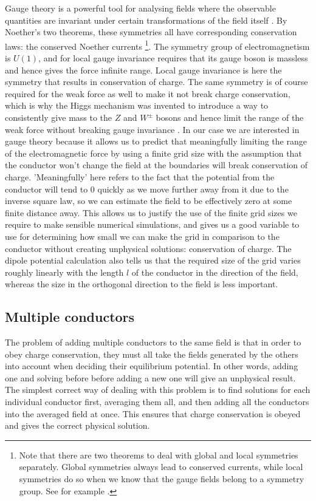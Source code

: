\documentclass[aps,twocolumn,pre,nofootinbib]{revtex4-1}
\begin{document}
Gauge theory is a powerful tool for analysing fields where the observable quantities are invariant under certain transformations of the field itself \cite{gaugetheory1}. By Noether's two theorems, these symmetries all have corresponding conservation laws: the conserved Noether currents \footnote{Note that there are two theorems to deal with global and local symmetries separately. Global symmetries always lead to conserved currents, while local symmetries do so when we know that the gauge fields belong to a symmetry group. See for example \cite{gaugetheory2}.}. The symmetry group of electromagnetism is $U(1)$, and for local gauge invariance requires that its gauge boson is massless and hence gives the force infinite range. Local gauge invariance is here the symmetry that results in conservation of charge. The same symmetry is of course required for the weak force as well to make it not break charge conservation, which is why the Higgs mechanism was invented to introduce a way to consistently give mass to the $Z$ and $W^{\pm}$ bosons and hence limit the range of the weak force without breaking gauge invariance \cite{gaugetheory3}. In our case we are interested in gauge theory because it allows us to predict that meaningfully limiting the range of the electromagnetic force by using a finite grid size with the assumption that the conductor won't change the field at the 
boundaries will break conservation of charge. 'Meaningfully' here refers to the fact that the potential from the conductor will tend to 0 quickly as we move further away from it due to the inverse square law, so we can estimate the field to be effectively zero at some finite distance away. This allows us to justify the use of the finite grid sizes we require to make sensible numerical simulations, and gives us a good variable to use for determining how small we can make the grid in comparison to the conductor without creating unphysical solutions: conservation of charge. The dipole potential calculation also tells us that the required size of the grid varies roughly linearly with the length $l$ of the conductor in the direction of the field, whereas the size in the orthogonal direction to the field is less important.

\subsection*{Multiple conductors}
The problem of adding multiple conductors to the same field is that in order to obey charge conservation, they must all take the fields generated by the others into account when deciding their equilibrium potential. In other words, adding one and solving before before adding a new one will give an unphysical result. The simplest correct way of dealing with this problem is to find solutions for each individual conductor first, averaging them all, and then adding all the conductors into the averaged field at once. This ensures that charge conservation is obeyed and gives the correct physical solution.
\end{document}
